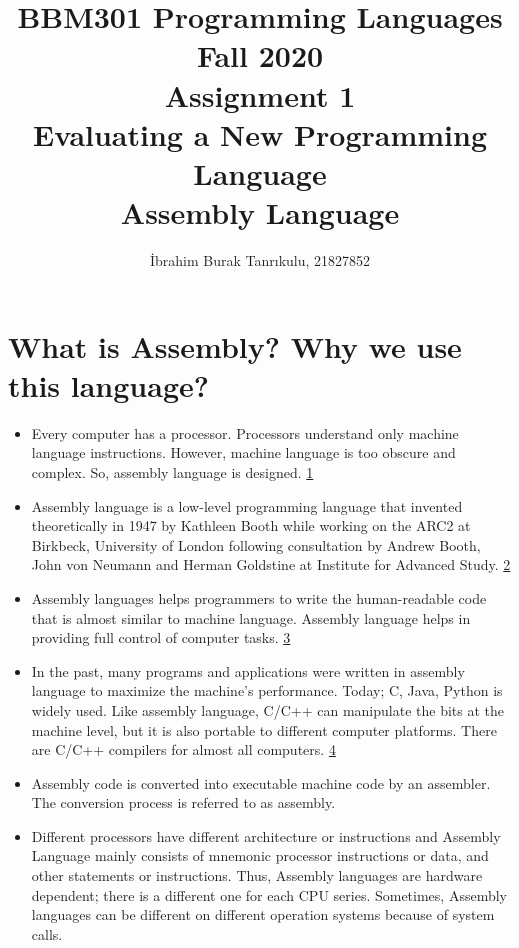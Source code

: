 \documentclass[11pt]{article}
\begin{document}
\author{İbrahim Burak Tanrıkulu, 21827852}
\title{BBM301 Programming Languages\\Fall 2020\\Assignment 1\\Evaluating a New Programming Language\\Assembly Language}
\maketitle

\section{What is Assembly? Why we use this language?}

\begin{itemize}
	\item { Every computer has a processor. Processors understand only machine language instructions. However, machine language is too obscure and complex. So, assembly language is designed. \href{https://www.tutorialspoint.com/assembly_programming/assembly_introduction.htm}{1}}
	\item { Assembly language is a low-level programming language that invented theoretically in 1947 by Kathleen Booth while working on the ARC2 at Birkbeck, University of London following consultation by Andrew Booth, John von Neumann and Herman Goldstine at Institute for Advanced Study. \href{https://en.wikipedia.org/wiki/Assembly_language}{2}}
	\item { Assembly languages helps programmers to write the human-readable code that is almost similar to machine language. Assembly language helps in providing full control of computer tasks. \href{https://www.educba.com/what-is-assembly-language/}{3}}
	\item { In the past, many programs and applications were written in assembly language to maximize the machine's performance. Today; C, Java, Python is widely used. Like assembly language, C/C++ can manipulate the bits at the machine level, but it is also portable to different computer platforms. There are C/C++ compilers for almost all computers. \href{https://www.pcmag.com/encyclopedia/term/assembly-language}{4}}
	\item { Assembly code is converted into executable machine code by an assembler. The conversion process is referred to as assembly.}
	\item { Different processors have different architecture or instructions and Assembly Language mainly consists of mnemonic processor instructions or data, and other statements or instructions. Thus, Assembly languages are hardware dependent; there is a different one for each CPU series. Sometimes, Assembly languages can be different on different operation systems because of system calls. }

\end{itemize}
\end{document}
